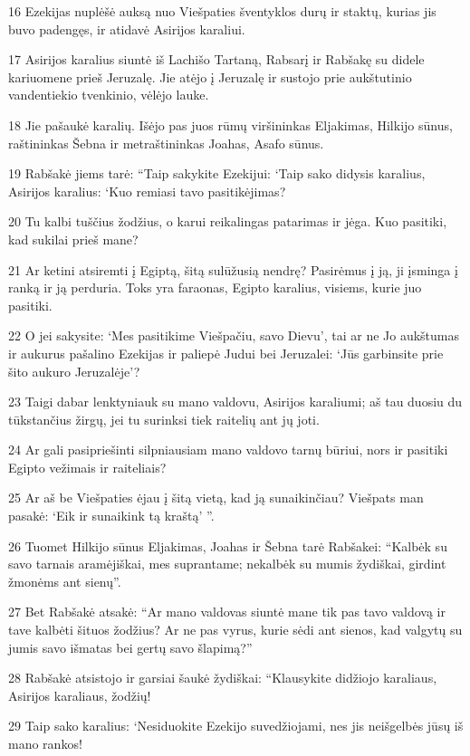 \par 16 Ezekijas nuplėšė auksą nuo Viešpaties šventyklos durų ir staktų, kurias jis buvo padengęs, ir atidavė Asirijos karaliui. 
\par 17 Asirijos karalius siuntė iš Lachišo Tartaną, Rabsarį ir Rabšakę su didele kariuomene prieš Jeruzalę. Jie atėjo į Jeruzalę ir sustojo prie aukštutinio vandentiekio tvenkinio, vėlėjo lauke. 
\par 18 Jie pašaukė karalių. Išėjo pas juos rūmų viršininkas Eljakimas, Hilkijo sūnus, raštininkas Šebna ir metraštininkas Joahas, Asafo sūnus. 
\par 19 Rabšakė jiems tarė: “Taip sakykite Ezekijui: ‘Taip sako didysis karalius, Asirijos karalius: ‘Kuo remiasi tavo pasitikėjimas? 
\par 20 Tu kalbi tuščius žodžius, o karui reikalingas patarimas ir jėga. Kuo pasitiki, kad sukilai prieš mane? 
\par 21 Ar ketini atsiremti į Egiptą, šitą sulūžusią nendrę? Pasirėmus į ją, ji įsminga į ranką ir ją perduria. Toks yra faraonas, Egipto karalius, visiems, kurie juo pasitiki. 
\par 22 O jei sakysite: ‘Mes pasitikime Viešpačiu, savo Dievu’, tai ar ne Jo aukštumas ir aukurus pašalino Ezekijas ir paliepė Judui bei Jeruzalei: ‘Jūs garbinsite prie šito aukuro Jeruzalėje’? 
\par 23 Taigi dabar lenktyniauk su mano valdovu, Asirijos karaliumi; aš tau duosiu du tūkstančius žirgų, jei tu surinksi tiek raitelių ant jų joti. 
\par 24 Ar gali pasipriešinti silpniausiam mano valdovo tarnų būriui, nors ir pasitiki Egipto vežimais ir raiteliais? 
\par 25 Ar aš be Viešpaties ėjau į šitą vietą, kad ją sunaikinčiau? Viešpats man pasakė: ‘Eik ir sunaikink tą kraštą’ ”. 
\par 26 Tuomet Hilkijo sūnus Eljakimas, Joahas ir Šebna tarė Rabšakei: “Kalbėk su savo tarnais aramėjiškai, mes suprantame; nekalbėk su mumis žydiškai, girdint žmonėms ant sienų”. 
\par 27 Bet Rabšakė atsakė: “Ar mano valdovas siuntė mane tik pas tavo valdovą ir tave kalbėti šituos žodžius? Ar ne pas vyrus, kurie sėdi ant sienos, kad valgytų su jumis savo išmatas bei gertų savo šlapimą?” 
\par 28 Rabšakė atsistojo ir garsiai šaukė žydiškai: “Klausykite didžiojo karaliaus, Asirijos karaliaus, žodžių! 
\par 29 Taip sako karalius: ‘Nesiduokite Ezekijo suvedžiojami, nes jis neišgelbės jūsų iš mano rankos! 

